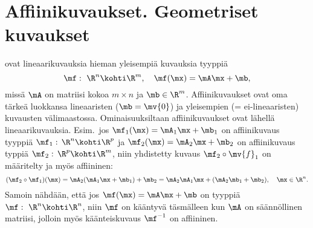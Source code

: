 \section{Affiinikuvaukset. Geometriset kuvaukset} \label{affiinikuvaukset} 
\alku
{}

 ovat lineaarikuvauksia hieman yleisempiä kuvauksia tyyppiä
\[ 
\mf:\ \R^n \kohti \R^m, \quad \mf(\mx) = \mA\mx + \mb, 
\]
missä $\mA$ on matriisi kokoa $m \times n$ ja $\mb \in \R^m$. Affiinikuvaukset ovat oma tärkeä
luokkansa lineaaristen ($\mb = \mv{0}$) ja yleisempien
%
 (= ei-lineaaristen)
kuvausten välimaastossa. Ominaisuuksiltaan affiinikuvaukset ovat lähellä lineaarikuvauksia. 
Esim.\ jos $\mf_1(\mx) = \mA_1 \mx + \mb_1$ on affiinikuvaus tyyppiä 
$\mf_1:\,\R^n \kohti \R^p$ ja $\mf_2(\mx) = \mA_2 \mx + \mb_2$ on affiinikuvaus typpiä 
$\mf_2:\,\R^p \kohti \R^m$, niin yhdistetty kuvaus $\mf_2\circ\mv{f}_1$ on määritelty ja myös 
affiininen:
\[ 
(\mf_2\circ\mf_1)(\mx) = \mA_2(\mA_1\mx + \mb_1) + \mb_2 
                       = \mA_2\mA_1\mx + (\mA_2\mb_1 + \mb_2), \quad \mx \in \R^n. 
\]
Samoin nähdään, että jos $\mf(\mx) =  \mA\mx + \mb$ on tyyppiä $\mf:\ \R^n \kohti \R^n$, niin 
$\mf$ on kääntyvä täsmälleen kun $\mA$ on säännöllinen matriisi, jolloin myös
%
käänteiskuvaus $\mf^{-1}$ on affiininen.


